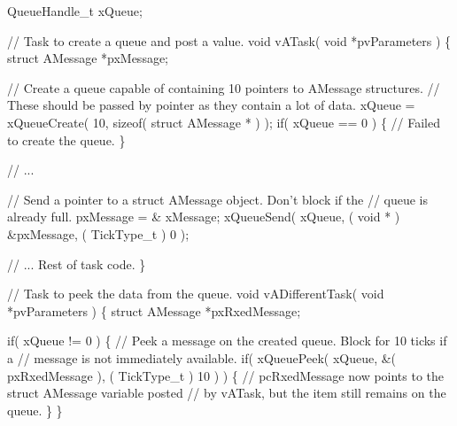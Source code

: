 \begin{DoxyPre}QueueHandle\_t xQueue;\end{DoxyPre}



\begin{DoxyPre}// Task to create a queue and post a value.
void vATask( void *pvParameters )
\{
struct AMessage *pxMessage;\end{DoxyPre}



\begin{DoxyPre}   // Create a queue capable of containing 10 pointers to AMessage structures.
   // These should be passed by pointer as they contain a lot of data.
   xQueue = xQueueCreate( 10, sizeof( struct AMessage * ) );
   if( xQueue == 0 )
   \{
    // Failed to create the queue.
   \}\end{DoxyPre}



\begin{DoxyPre}   // ...\end{DoxyPre}



\begin{DoxyPre}   // Send a pointer to a struct AMessage object.  Don't block if the
   // queue is already full.
   pxMessage = \& xMessage;
   xQueueSend( xQueue, ( void * ) \&pxMessage, ( TickType\_t ) 0 );\end{DoxyPre}



\begin{DoxyPre}   // ... Rest of task code.
\}\end{DoxyPre}



\begin{DoxyPre}// Task to peek the data from the queue.
void vADifferentTask( void *pvParameters )
\{
struct AMessage *pxRxedMessage;\end{DoxyPre}



\begin{DoxyPre}   if( xQueue != 0 )
   \{
    // Peek a message on the created queue.  Block for 10 ticks if a
    // message is not immediately available.
    if( xQueuePeek( xQueue, \&( pxRxedMessage ), ( TickType\_t ) 10 ) )
    \{
        // pcRxedMessage now points to the struct AMessage variable posted
        // by vATask, but the item still remains on the queue.
    \}
   \}\end{DoxyPre}



